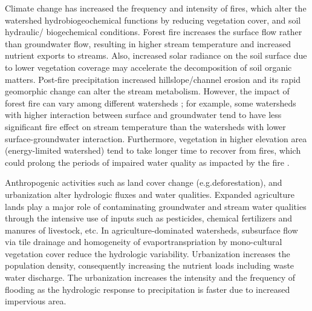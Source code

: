 \documentclass[preprint,review, 12pt]{elsarticle}
\begin{document}
Climate change has increased the frequency and intensity of fires, which alter the watershed hydrobiogeochemical functions by reducing vegetation cover, and soil hydraulic/ biogechemical conditions. Forest fire increases the surface flow rather than groundwater flow, resulting in higher stream temperature\citep{Wagner2014a} and increased nutrient exports to streams\citep{Hanan2017}. Also, increased solar radiance on the soil surface due to lower vegetation coverage may accelerate the decomposition of soil organic matters\citep{Wagner2014a}. Post-fire precipitation increased hillslope/channel erosion and its rapid geomorphic change can alter the stream metabolism\citep{Tuckett2016}. However, the impact of forest fire can vary among different watersheds \citep{Oda2018}; for example, some watersheds with higher interaction between surface and groundwater tend to have less significant fire effect on stream temperature than the watersheds with lower surface-groundwater interaction\citep{Wagner2014a}. Furthermore, vegetation in higher elevation area (energy-limited watershed) tend to take longer time to recover from fires, which could prolong the periods of impaired water quality as impacted by the fire \citep{Wagner2014a}.

Anthropogenic activities such as land cover change (e.g.deforestation), and urbanization alter hydrologic fluxes and water qualities. Expanded agriculture lands play a major role of contaminating groundwater and stream water qualities through the intensive use of inputs such as pesticides, chemical fertilizers and manures of livestock, etc. In agriculture-dominated watersheds, subsurface flow via tile drainage and homogeneity of evaportranspriation by mono-cultural vegetation cover reduce the hydrologic variability. Urbanization increases the population density, consequently increasing the nutrient loads including waste water discharge. The urbanization increases the intensity and the frequency of flooding as the hydrologic response to precipitation is faster due to increased impervious area.
\end{document}
